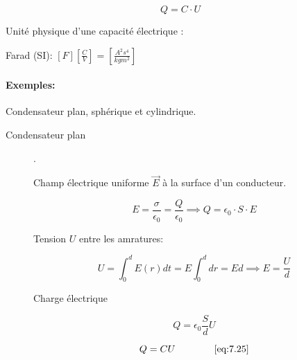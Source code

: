 \documentclass[
    11pt,
    a4paper,
    oneside,
    headinlcude, footinclude,
    twoside,
]{report}
\renewcommand{\vec}[1]{\overrightarrow{#1}}
\begin{document}
\begin{equation}
    \label{eq:7.25}
    Q = C \cdot U
\end{equation}

Unité physique d'une capacité électrique :

Farad (SI): $[F] \left[\frac{C}{V}\right] = \left[\frac{A^2s^4}{kg m^2}\right]$

\paragraph{Exemples:}

Condensateur plan, sphérique et cylindrique.

\begin{description}
    \item[Condensateur plan] {\color{white}.}

        \begin{center}
            \begin{minipage}{.5\linewidth}
            \end{minipage}
            \begin{minipage}{.49\linewidth}
                \setlength{\parskip}{.3em}
                Champ électrique uniforme $\vec E$ à la surface d'un
                conducteur.

                \begin{equation}
                    \label{eq:7.26}
                    E = \frac{\sigma}{\epsilon_0} = \frac{Q}{\epsilon_0}
                    \implies Q = \epsilon_0 \cdot S \cdot E
                \end{equation}
            \end{minipage}
        \end{center}

        Tension $U$ entre les amratures:

        \begin{equation}
            \label{eq:7.27}
            U = \int_0^d E(r) dt=  E \int_0^d dr = E d \implies E = \frac{U}{d}
        \end{equation}
        
        Charge électrique

        \begin{center}
            \begin{minipage}{.5\linewidth}
                \setlength{\parskip}{.3em}
                \begin{equation}
                    \label{eq:7.28}
                    Q = \epsilon_0 \frac{S}{d} U 
                \end{equation}
            \end{minipage}
            \begin{minipage}{.49\linewidth}
                \setlength{\parskip}{.3em}
                $$ Q = CU \quad \quad \quad \quad \eqref{eq:7.25}$$
            \end{minipage}
        \end{center}


\end{description}
\end{document}
